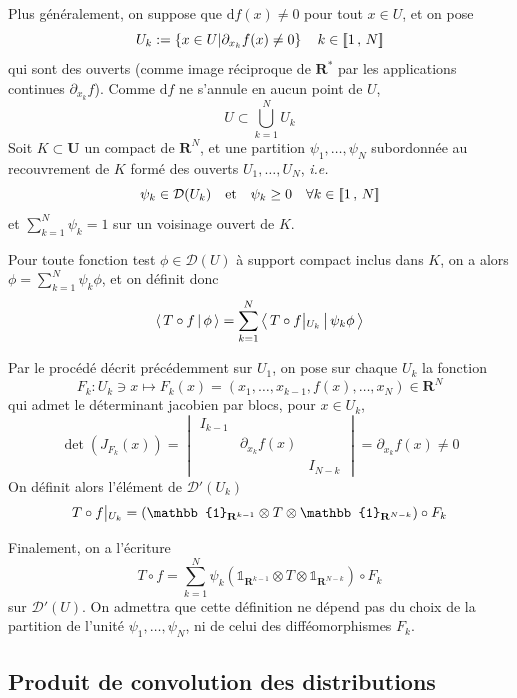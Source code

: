         Plus généralement, on suppose que $\text{d}f(x) \neq 0$ pour tout $x \in U$, et on pose 
        \[ U_k := \left\{x \in U \middle| \partial_{x_k} f(x) \neq 0\right\} \quad k \in \left[\!\left[ 1 \, , \, N \right]\!\right] \]   
        qui sont des ouverts (comme image réciproque de $\mathbf{R}^*$ par les applications continues $\partial_{x_k}f$). Comme $\text{d}f$ ne s’annule en aucun point de $U$, 
        \[ U \subset \bigcup_{k=1}^N U_k \]
        Soit $K \subset \mathbf{U}$ un compact de $\mathbf{R}^N$, et une partition $\psi_1, \ldots, \psi_N$ subordonnée au recouvrement de $K$ formé des ouverts $U_1, \ldots, U_N$, \textit{i.e.} 
        \[ \psi_{k} \in \mathcal{D}(U_k) \quad \text{et} \quad \psi_k \geq 0 \quad \forall k \in \left[\!\left[ 1 \, , \, N \right]\!\right] \]   
        et $\sum_{k=1}^N \psi_k = 1$ sur un voisinage ouvert de $K$. 

        Pour toute fonction test $\phi \in \mathcal{D}(U)$ à support compact inclus dans $K$, on a alors $\phi = \sum_{k=1}^N \psi_k \phi$, et on définit donc 
        \[ \left< \, T \circ f \, \middle| \, \phi \, \right> = \sum_{k=1}^N \left< \, T \circ f \big|\vphantom{|}_{U_k} \, \middle| \, \psi_k \phi \, \right> \]   

        Par le procédé décrit précédemment sur $U_1$, on pose sur chaque $U_k$ la fonction 
        \[ F_k : U_k \ni x \mapsto F_k(x) = (x_1, \ldots, x_{k-1}, f(x), \ldots, x_N) \in \mathbf{R}^N \]   
        qui admet le déterminant jacobien par blocs, pour $x \in U_k$,
        \[ \det(J_{F_k}(x)) = \begin{vmatrix}
            I_{k - 1} & & \\
            & \partial_{x_k} f(x) & \\
            & & I_{N-k}
        \end{vmatrix} = \partial_{x_k}f(x) \neq 0 \]   
        On définit alors l’élément de $\mathcal{D}'(U_k)$ 
        \[ T \circ f \big|\vphantom{|}_{U_k} = \left(\mathbb{1}_{\mathbf{R}^{k-1}}\otimes T \otimes \mathbb{1}_{\mathbf{R}^{N-k}}\right)  \circ F_k \]   
        
        Finalement, on a l’écriture 
        \[ T \circ f = \sum_{k=1}^N \psi_k \left(\mathbb{1}_{\mathbf{R}^{k-1}}\otimes T \otimes \mathbb{1}_{\mathbf{R}^{N-k}}\right)  \circ F_k \]   
        sur $\mathcal{D}'(U)$. On admettra que cette définition ne dépend pas du choix de la partition de l’unité $\psi_1, \ldots, \psi_N$, ni de celui des difféomorphismes $F_k$.

    \subsection{Produit de convolution des distributions}

